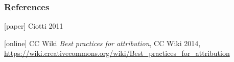 \begin{frame}
    \frametitle{References}
    \addtocounter{nframe}{1}
    \begin{thebibliography}{10}

        [paper]
        \tiny{} Ciotti 2011

        [online]
        \tiny{} CC Wiki \textit{Best practices for attribution}, CC Wiki 2014, \url{https://wiki.creativecommons.org/wiki/Best\_practices\_for\_attribution}

    \end{thebibliography}

\end{frame}